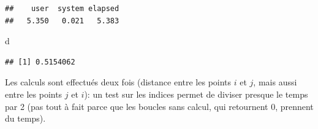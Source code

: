 \documentclass[
  12pt,
  french,
  a4paper,
  extrafontsizes,onecolumn,openright
  ]{memoir}
\newenvironment{Shaded}{\begin{snugshade}}{\end{snugshade}}
\newcommand{\ControlFlowTok}[1]{\textcolor[rgb]{0.13,0.29,0.53}{\textbf{#1}}}
\newcommand{\DecValTok}[1]{\textcolor[rgb]{0.00,0.00,0.81}{#1}}
\newcommand{\KeywordTok}[1]{\textcolor[rgb]{0.13,0.29,0.53}{\textbf{#1}}}
\newcommand{\NormalTok}[1]{#1}
\newcommand{\OperatorTok}[1]{\textcolor[rgb]{0.81,0.36,0.00}{\textbf{#1}}}
\newcommand{\StringTok}[1]{\textcolor[rgb]{0.31,0.60,0.02}{#1}}
\begin{document}
\begin{verbatim}
##    user  system elapsed 
##   5.350   0.021   5.383
\end{verbatim}

\begin{Shaded}
\begin{Highlighting}[]
\NormalTok{d}
\end{Highlighting}
\end{Shaded}

\begin{verbatim}
## [1] 0.5154062
\end{verbatim}

\normalsize

Les calculs sont effectués deux fois (distance entre les points \(i\) et \(j\), mais aussi entre les points \(j\) et \(i\)): un test sur les indices permet de diviser presque le temps par 2 (pas tout à fait parce que les boucles sans calcul, qui retournent \(0\), prennent du temps).

\scriptsize

\begin{Shaded}
\end{Shaded}
\end{document}
